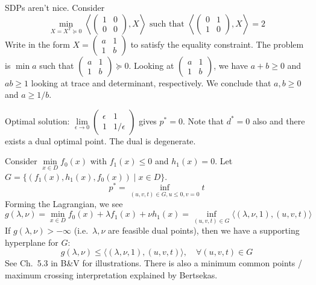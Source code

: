 \documentclass[english, 11pt]{article}
\begin{document}
\begin{rem}
SDPs aren't nice. Consider 
\[
 \min \limits_{X=X^T \succeq 0} \left \langle \begin{pmatrix} 1 & 0 \\ 0 & 0 \end{pmatrix}, X \right \rangle \text{ such that }
\left \langle \begin{pmatrix} 0 & 1 \\ 1 & 0\end{pmatrix}, X \right \rangle =2
\]
Write in the form $X = \begin{pmatrix} a & 1 \\ 1 & b \end{pmatrix}$ to satisfy the equality constraint. The problem is $\min a$ such that $ \begin{pmatrix} a & 1 \\ 1 & b \end{pmatrix} \succeq 0$. Looking at $\begin{pmatrix} a & 1 \\ 1 & b \end{pmatrix}$, we have $a + b \ge 0$ and $ab \ge 1$ looking at trace and determinant, respectively. We conclude that $ a,b \ge 0$ and $a \ge 1/b$.

Optimal solution: $\lim \limits_{\epsilon \to 0} \begin{pmatrix} \epsilon & 1 \\ 1 & 1/\epsilon \end{pmatrix}$ gives $p^*=0$.
Note that $d^*=0$ also and there exists a dual optimal point. The dual is degenerate.
\end{rem}


\begin{rem}
Consider $\min \limits_{x \in D} f_0(x)$ with $f_1(x) \le 0$ and $h_1(x) =0$. Let $G = \{ (f_1(x),h_1(x), f_0(x) ) \mid x \in D \}$.
\[
p^* = \inf \limits_{(u,v,t) \in G, u \le 0, v=0} t
\]
Forming the Lagrangian, we see
\[
g(\lambda,\nu) =  \min \limits_{x \in D}   f_0(x) + \lambda f_1(x) + \nu h_1(x)
= \inf \limits_{(u,v,t) \in G} \langle (\lambda,\nu,1) , (u,v,t) \rangle
\]
If $g(\lambda,\nu) > -\infty$ (i.e.\ $\lambda,\nu$ are feasible dual points), then we have a supporting hyperplane for $G$:
\[
g(\lambda,\nu) \le  \langle (\lambda,\nu,1) , (u,v,t) \rangle, \quad \forall (u,v,t) \in G
\]
See Ch.\ 5.3 in B\&V for illustrations. There is also a minimum common points / maximum crossing interpretation explained by Bertsekas.
\end{rem}
\end{document}
